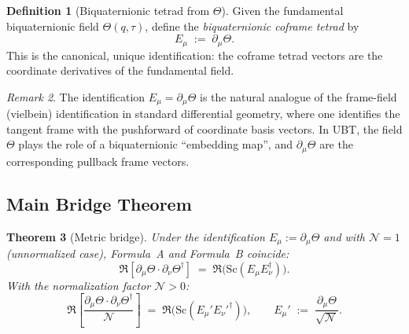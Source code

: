 \documentclass[12pt]{article}
\newtheorem{theorem}{Theorem}[section]
\theoremstyle{definition}
\newtheorem{definition}[theorem]{Definition}
\theoremstyle{remark}
\newtheorem{remark}[theorem]{Remark}
\begin{document}
\begin{definition}[Biquaternionic tetrad from $\Theta$]
\label{def:tetrad_natural}
Given the fundamental biquaternionic field $\Theta(q,\tau)$, define the
\emph{biquaternionic coframe tetrad} by
\begin{equation}
  \boxed{E_\mu \;:=\; \partial_\mu\Theta.}
  \label{eq:tetrad_identification}
\end{equation}
This is the canonical, unique identification: the coframe tetrad vectors are
the coordinate derivatives of the fundamental field.
\end{definition}

\begin{remark}
The identification $E_\mu = \partial_\mu\Theta$ is the natural analogue of the
frame-field (vielbein) identification in standard differential geometry, where
one identifies the tangent frame with the pushforward of coordinate basis vectors.
In UBT, the field $\Theta$ plays the role of a biquaternionic ``embedding map'',
and $\partial_\mu\Theta$ are the corresponding pullback frame vectors.
\end{remark}

\subsection{Main Bridge Theorem}

\begin{theorem}[Metric bridge]
\label{thm:metric_bridge}
Under the identification $E_\mu := \partial_\mu\Theta$ and with $\mathcal{N} = 1$
(unnormalized case), Formula~A and Formula~B coincide:
\begin{equation}
  \Re\!\left[\partial_\mu\Theta\cdot\partial_\nu\Theta^\dagger\right]
  \;=\;
  \Re\!\bigl(\mathrm{Sc}(E_\mu E_\nu^\dagger)\bigr).
  \label{eq:bridge_N1}
\end{equation}
With the normalization factor $\mathcal{N} > 0$:
\begin{equation}
  \Re\!\left[\frac{\partial_\mu\Theta\cdot\partial_\nu\Theta^\dagger}{\mathcal{N}}\right]
  \;=\;
  \Re\!\bigl(\mathrm{Sc}(E_\mu' E_\nu'^\dagger)\bigr),
  \qquad
  E_\mu' \;:=\; \frac{\partial_\mu\Theta}{\sqrt{\mathcal{N}}}.
  \label{eq:bridge_normalized}
\end{equation}
\end{theorem}
\end{document}
